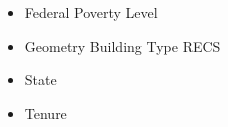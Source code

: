 \begin{itemize}
\item Federal Poverty Level
\item Geometry Building Type RECS
\item State
\item Tenure
\end{itemize}
